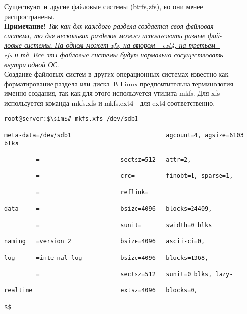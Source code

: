 \documentclass[14pt, a4paper]{article}
\begin{document}
Существуют и другие файловые системы (btrfs,zfs), но они менее распространены.\\

\textbf{Примечание!} \underline{\textit{Так как для каждого раздела создается своя файловая}}\\
\underline{\textit{система, то для нескольких разделов можно использовать разные фай-}} \\
\underline{\textit{ловые системы. На одном может xfs, на втором - ext4, на третьем - }}\\
\underline{\textit{zfs и тд. Все эти файловые системы будут нормально сосуществовать}} \\
\underline{\textit{внутри одной ОС}}.\\

Создание файловых систем в других операционных системах известно как форматирование раздела
или диска. В Linux предпочтительна терминология именно создания, так как для этого используется
утилита \colorbox{backcolour}{mkfs}. Для \colorbox{backcolour}{xfs} используется команда \colorbox{backcolour}{mkfs.xfs} и \colorbox{backcolour}{mkfs.ext4} - для ext4 соответственно.

\vspace{0.3cm}

\begin{lstlisting}[mathescape=true]
root@server:$\sim$# mkfs.xfs /dev/sdb1

meta-data=/dev/sdb1                           agcount=4, agsize=6103 blks

         =                       sectsz=512   attr=2,

         =                       crc=         finobt=1, sparse=1,

         =                       reflink=

data     =                       bsize=4096   blocks=24409,

         =                       sunit=       swidth=0 blks

naming   =version 2              bsize=4096   ascii-ci=0,

log      =internal log           bsize=4096   blocks=1368,

         =                       sectsz=512   sunit=0 blks, lazy-
         
realtime                         extsz=4096   blocks=0,

$$

\end{lstlisting}
\end{document}
